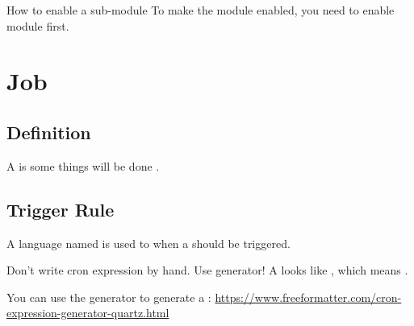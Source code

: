 \begin{example}{How to enable a sub-module}
    To make the module  enabled, you need to enable  module first.
\end{example}


\section{Job}

\subsection{Definition}
A  is some things will be done .

\subsection{Trigger Rule}
A language named  is used to  when a  should be triggered.

\begin{tips}{Don't write cron expression by hand. Use generator!}
    A  looks like , which means .

    You can use the generator to generate a :
    \url{https://www.freeformatter.com/cron-expression-generator-quartz.html}
\end{tips}